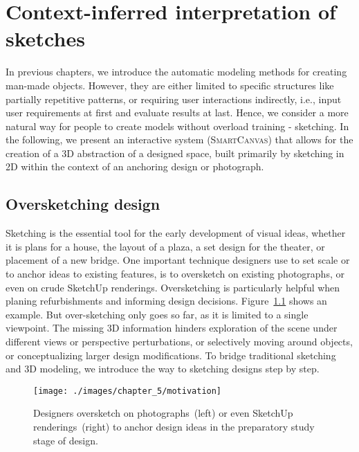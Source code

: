 

\chapter{Context-inferred interpretation of sketches}
\label{chapter5}

In previous chapters, we introduce the automatic modeling methods for creating man-made objects. However, they are either limited to specific structures like partially repetitive patterns, or requiring user interactions indirectly, i.e., input user requirements at first and evaluate results at last. Hence, we consider a more natural way for people to create models without overload training - sketching. In the following, we present an interactive system (\textsc{SmartCanvas}) that allows for the creation of a 3D abstraction of a designed space, built primarily by sketching in 2D within the context of an anchoring design or photograph.

\section{Oversketching design}

Sketching is the essential tool for the early development of visual ideas, whether it is plans for a house, the layout of a plaza, a set design for the theater, or placement of a new bridge. One important technique designers use to set scale or to anchor ideas to existing features, is to oversketch on existing photographs, or even on crude SketchUp renderings. Oversketching is particularly helpful when planing refurbishments and informing design decisions. Figure~\ref{fig:motivation} shows an example. But over-sketching only goes so far, as it is limited to a single viewpoint. The missing 3D information hinders exploration of the scene under different views or perspective perturbations, or selectively moving around objects, or conceptualizing larger design
modifications. To bridge traditional sketching and 3D modeling, we introduce the way to sketching designs step by step.

\begin{figure}[b!]
  \texttt{[image: ./images/chapter\_5/motivation]}
  \caption[The motivation of oversketching design.]{Designers oversketch on photographs~(left) or even SketchUp renderings~(right) to anchor design ideas in the preparatory study stage of design.} \label{fig:motivation}
\end{figure}

